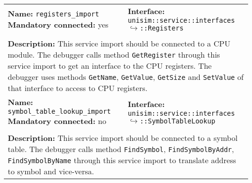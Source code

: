 \begin{center}
\begin{tabular}{|p{7.5cm}|p{7.5cm}|}
		\hline
		\multicolumn{1}{|p{7.5cm}}{\textbf{Name:} \texttt{registers\_import} \newline \textbf{Mandatory connected:} yes} & \multicolumn{1}{p{7.5cm}|}{\textbf{Interface:} \newline \texttt{unisim::service::interfaces} \newline$\hookrightarrow$\texttt{::Registers}}\\
		\multicolumn{2}{|l|}{}\\
		\multicolumn{2}{|p{15cm}|}{\textbf{Description:} \newline This service import should be connected to a CPU module. The debugger calls method \texttt{GetRegister} through this service import to get an interface to the CPU registers. The debugger uses methods \texttt{GetName}, \texttt{GetValue}, \texttt{GetSize} and \texttt{SetValue} of that interface to access to CPU registers.}\\
		\hline
		\multicolumn{1}{|p{7.5cm}}{\textbf{Name:} \texttt{symbol\_table\_lookup\_import} \newline \textbf{Mandatory connected:} no} & \multicolumn{1}{p{7.5cm}|}{\textbf{Interface:} \newline \texttt{unisim::service::interfaces} \newline$\hookrightarrow$\texttt{::SymbolTableLookup}}\\
		\multicolumn{2}{|l|}{}\\
		\multicolumn{2}{|p{15cm}|}{\textbf{Description:} \newline This service import should be connected to a symbol table. The debugger calls method \texttt{FindSymbol}, \texttt{FindSymbolByAddr}, \texttt{FindSymbolByName} through this service import to translate address to symbol and vice-versa.}\\
		\hline
	\end{tabular}
\end{center}

